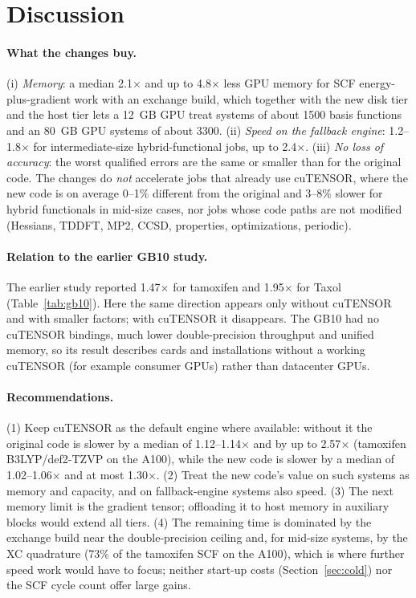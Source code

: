 \section{Discussion}
\label{sec:discussion}

\paragraph{What the changes buy.} (i) \emph{Memory}: a median 2.1$\times$ and up to 4.8$\times$ less GPU memory for SCF energy-plus-gradient work with an exchange build, which together with the new disk tier and the host tier lets a 12~GB GPU treat systems of about 1500 basis functions and an 80~GB GPU systems of about 3300. (ii) \emph{Speed on the fallback engine}: 1.2--1.8$\times$ for intermediate-size hybrid-functional jobs, up to 2.4$\times$. (iii) \emph{No loss of accuracy}: the worst qualified errors are the same or smaller than for the original code. The changes do \emph{not} accelerate jobs that already use cuTENSOR, where the new code is on average 0--1\% different from the original and 3--8\% slower for hybrid functionals in mid-size cases, nor jobs whose code paths are not modified (Hessians, TDDFT, MP2, CCSD, properties, optimizations, periodic).

\paragraph{Relation to the earlier GB10 study.} The earlier study reported 1.47$\times$ for tamoxifen and 1.95$\times$ for Taxol (Table~\ref{tab:gb10}). Here the same direction appears only without cuTENSOR and with smaller factors; with cuTENSOR it disappears. The GB10 had no cuTENSOR bindings, much lower double-precision throughput and unified memory, so its result describes cards and installations without a working cuTENSOR (for example consumer GPUs) rather than datacenter GPUs.

\paragraph{Recommendations.} (1) Keep cuTENSOR as the default engine where available: without it the original code is slower by a median of 1.12--1.14$\times$ and by up to 2.57$\times$ (tamoxifen B3LYP/def2-TZVP on the A100), while the new code is slower by a median of 1.02--1.06$\times$ and at most 1.30$\times$. (2) Treat the new code's value on such systems as memory and capacity, and on fallback-engine systems also speed. (3) The next memory limit is the gradient tensor; offloading it to host memory in auxiliary blocks would extend all tiers. (4) The remaining time is dominated by the exchange build near the double-precision ceiling and, for mid-size systems, by the XC quadrature (73\% of the tamoxifen SCF on the A100), which is where further speed work would have to focus; neither start-up costs (Section~\ref{sec:cold}) nor the SCF cycle count offer large gains.
